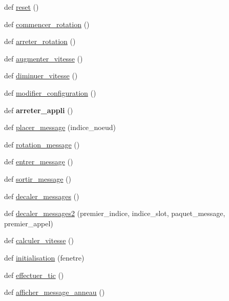 \begin{DoxyCompactItemize}
def \hyperlink{namespacesimulation__v2_a06c296942e0342b42a775997398f5a12}{reset} ()
\item 
def \hyperlink{namespacesimulation__v2_ae224f3fc4f8786e5967881001e3b6e9d}{commencer\+\_\+rotation} ()
\item 
def \hyperlink{namespacesimulation__v2_a7a8451d5c99689fced7289d78961e814}{arreter\+\_\+rotation} ()
\item 
def \hyperlink{namespacesimulation__v2_a6a6d472b1a32c0c24716adb2836b7b58}{augmenter\+\_\+vitesse} ()
\item 
def \hyperlink{namespacesimulation__v2_aeae1774d8ecd12b360ce7f7c31194faa}{diminuer\+\_\+vitesse} ()
\item 
def \hyperlink{namespacesimulation__v2_ae0e0ae363070b93d9e9ed857b163ccde}{modifier\+\_\+configuration} ()
\item 
def {\bfseries arreter\+\_\+appli} ()\hypertarget{namespacesimulation__v2_a1098961410266ce62c459f0c13e0ff71}{}\label{namespacesimulation__v2_a1098961410266ce62c459f0c13e0ff71}

\item 
def \hyperlink{namespacesimulation__v2_a981249b829963643e2c4f0b3bb408788}{placer\+\_\+message} (indice\+\_\+noeud)
\item 
def \hyperlink{namespacesimulation__v2_a1a18b9b982c5ef2a17e75f2b01e01f21}{rotation\+\_\+message} ()
\item 
def \hyperlink{namespacesimulation__v2_a0a1587823f16b3bf9e71d033aa2b8f46}{entrer\+\_\+message} ()
\item 
def \hyperlink{namespacesimulation__v2_a3a8d360d9b84a8ce3db5c3624ae5864f}{sortir\+\_\+message} ()
\item 
def \hyperlink{namespacesimulation__v2_adf38abfa1e0850537ab944527cd5ae85}{decaler\+\_\+messages} ()
\item 
def \hyperlink{namespacesimulation__v2_a0e70120af3ecb3995d5d932b0c964dc1}{decaler\+\_\+messages2} (premier\+\_\+indice, indice\+\_\+slot, paquet\+\_\+message, premier\+\_\+appel)
\item 
def \hyperlink{namespacesimulation__v2_a40c91ad97e1bbfe377005f8ae6c82224}{calculer\+\_\+vitesse} ()
\item 
def \hyperlink{namespacesimulation__v2_aada081d6756c40a92bf58834b55be334}{initialisation} (fenetre)
\item 
def \hyperlink{namespacesimulation__v2_ab8dabe64b8e5657b9cb84cec6d233d0d}{effectuer\+\_\+tic} ()
\item 
def \hyperlink{namespacesimulation__v2_af15b64ee530c96b26d0d6fab6ff8214e}{afficher\+\_\+message\+\_\+anneau} ()
\end{DoxyCompactItemize}
